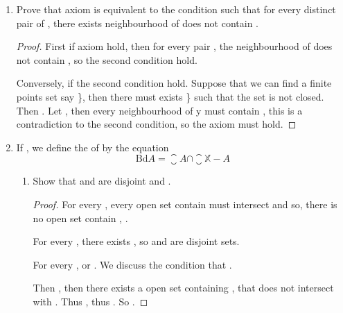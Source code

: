 \begin{enumerate}
      \item Prove that  axiom is equivalent to the condition such that for every distinct pair  of , there exists neighbourhood of  does not contain .
      
      \begin{proof}
            First if  axiom hold, then for every pair , the neighbourhood  of  does not contain , so the second condition hold.

            Conversely, if the second condition hold. Suppose that we can find a finite points set say \}, then there must exists \} such that the set  is not closed. Then . Let , then every neighbourhood of y must contain , this is a contradiction to the second condition, so the  axiom must hold.
      \end{proof}

      \item If , we define the \label{def:Boundary} of  by the equation
      \begin{equation*}
            \text{Bd} A = \closure{A} \cap \closure{\mathbb{X}-A}
      \end{equation*}
      \begin{enumerate}
            \item Show that  and  are disjoint and .
            
            \begin{proof}
                  For every , every open set contain  must intersect  and  so, there is no open set  contain , .

                  For every , there exists , so  and  are disjoint sets.

                  For every ,  or . We discuss the condition that .

                  Then , then there exists a open set  containing , that does not intersect with . Thus , thus . So .


\end{proof}
\end{enumerate}
\end{enumerate}

